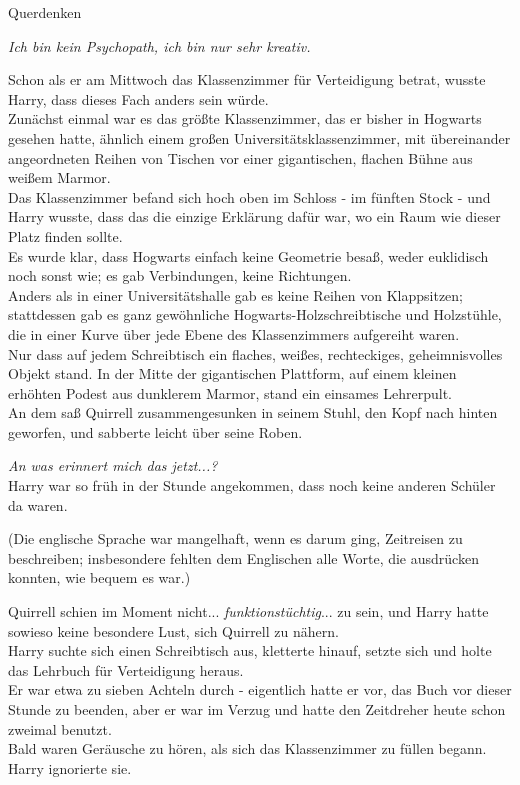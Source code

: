 

\hypertarget{querdenken}{%

Querdenken

\emph{Ich bin kein Psychopath, ich bin nur sehr kreativ.}

\hfill\break Schon als er am Mittwoch das Klassenzimmer für Verteidigung betrat, wusste Harry, dass dieses Fach anders sein würde.\\ Zunächst einmal war es das größte Klassenzimmer, das er bisher in Hogwarts gesehen hatte, ähnlich einem großen Universitätsklassenzimmer, mit übereinander angeordneten Reihen von Tischen vor einer gigantischen, flachen Bühne aus weißem Marmor.\\ Das Klassenzimmer befand sich hoch oben im Schloss - im fünften Stock - und Harry wusste, dass das die einzige Erklärung dafür war, wo ein Raum wie dieser Platz finden sollte.\\ Es wurde klar, dass Hogwarts einfach keine Geometrie besaß, weder euklidisch noch sonst wie; es gab Verbindungen, keine Richtungen.\\ Anders als in einer Universitätshalle gab es keine Reihen von Klappsitzen; stattdessen gab es ganz gewöhnliche Hogwarts-Holzschreibtische und Holzstühle, die in einer Kurve über jede Ebene des Klassenzimmers aufgereiht waren.\\ Nur dass auf jedem Schreibtisch ein flaches, weißes, rechteckiges, geheimnisvolles Objekt stand. In der Mitte der gigantischen Plattform, auf einem kleinen erhöhten Podest aus dunklerem Marmor, stand ein einsames Lehrerpult.\\ An dem saß Quirrell zusammengesunken in seinem Stuhl, den Kopf nach hinten geworfen, und sabberte leicht über seine Roben.

\emph{An was erinnert mich das jetzt...?}\\ Harry war so früh in der Stunde angekommen, dass noch keine anderen Schüler da waren.

(Die englische Sprache war mangelhaft, wenn es darum ging, Zeitreisen zu beschreiben; insbesondere fehlten dem Englischen alle Worte, die ausdrücken konnten, wie bequem es war.)

Quirrell schien im Moment nicht... \emph{funktionstüchtig}... zu sein, und Harry hatte sowieso keine besondere Lust, sich Quirrell zu nähern.\\ Harry suchte sich einen Schreibtisch aus, kletterte hinauf, setzte sich und holte das Lehrbuch für Verteidigung heraus.\\ Er war etwa zu sieben Achteln durch - eigentlich hatte er vor, das Buch vor dieser Stunde zu beenden, aber er war im Verzug und hatte den Zeitdreher heute schon zweimal benutzt.\\ Bald waren Geräusche zu hören, als sich das Klassenzimmer zu füllen begann. Harry ignorierte sie.

}
